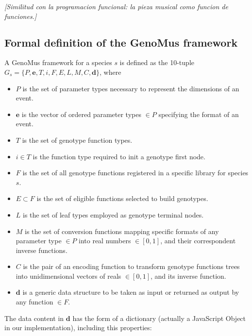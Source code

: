 \documentclass{article}
\renewcommand{\vec}[1]{\mathbf{#1}}
\begin{document}
{\color{gray} \textsl{[Similitud con la programacion funcional: la pieza musical como funcion de funciones.]}}





\subsection{Formal definition of the GenoMus framework}\label{sec:formaldef}

A GenoMus framework for a species $s$ is defined as the 10-tuple $G_s = \{P, \vec{e}, T, i, F, E, L, M, C, \vec{d}\}$, where

\begin{itemize}
\item $P$ is the set of parameter types necessary to represent the dimensions of an event.
\item $\vec{e}$ is the vector of ordered parameter types $\in P$ specifying the format of an event. 
\item $T$ is the set of genotype function types. 
\item $i \in T$ is the function type required to init a genotype first node.
\item $F$ is the set of all genotype functions registered in a specific library for species $s$.
\item $E \subset F$ is the set of eligible functions selected to build genotypes.
\item $L$ is the set of leaf types employed as genotype terminal nodes.
\item $M$ is the set of conversion functions mapping specific formats of any parameter type $\in P$ into real numbers $\in [0,1]$, and their correspondent inverse functions.
\item $C$ is the pair of an encoding function to transform genotype functions trees into unidimensional vectors of reals $\in [0,1]$, and its inverse function.
\item $\vec{d}$ is a generic data structure to be taken as input or returned as output by any function $\in F$.
\end{itemize}

The data content in $\vec{d}$ has the form of a dictionary (actually a JavaScript Object in our implementation), including this properties:
\end{document}
